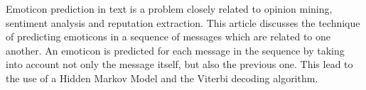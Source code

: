 Emoticon prediction in text is a problem closely related to opinion mining, sentiment analysis and reputation extraction. This article discusses the technique of predicting emoticons in a sequence of messages which are related to one another. An emoticon is predicted for each message in the sequence by taking into account not only the message itself, but also the previous one. This lead to the use of a Hidden Markov Model and the Viterbi decoding algorithm.

\begin{comment}
\red{Refine the abstract, maybe add most important results, a bit too much `lead`} \\
Emoticon prediction in text is a problem closely related to opinion mining, sentiment analysis and reputation extraction. This article discusses two different techniques for predicting emoticons. In the first case, emoticons are predicted based on a single, short message. This lead to the use of an average multiclass perceptron. In the second case, emoticons are predicted, using messages posted in the past. This leads to the previous message also determining the emotion of the message analysed. This lead to the use of a Hidden Markov Model and the Viterbi decoding algorithm.
\end{comment}